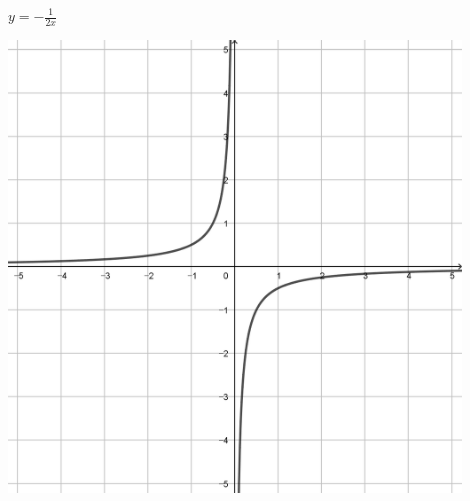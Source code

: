 \documentclass[a4paper]{oblivoir}
\begin{document}
\begin{minipage}{0.45\textwidth}\centering
\(y=-\frac1{2x}\)
\par\bigskip\includegraphics[width=0.9\textwidth]{img/4_rational_5}
\end{minipage}\bigskip\bigskip\par
\end{document}
